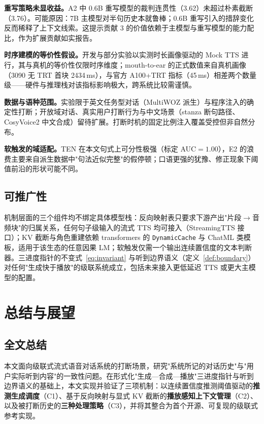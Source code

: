 \documentclass[conference]{IEEEtran}
\theoremstyle{definition}
\begin{document}
\textbf{重写策略未显收益。}A2 中 0.6B 重写模型的裁判连贯性（3.62）未超过朴素截断（3.76）。可能原因：7B 主模型对半句历史本就鲁棒；0.6B 重写引入的措辞变化反而稀释了上下文线索。这提示贡献 3 的价值依赖于主模型与重写模型的能力配比，作为扩展贡献如实报告。

\textbf{时序建模的等价性假设。}开发与部分实验以实测时长画像驱动的 Mock TTS 进行，其与真机的等价性仅限时序维度；mouth-to-ear 的正式数值来自真机画像（3090 无 TRT 首块 2434\,ms），与官方 A100+TRT 指标（45\,ms）相差两个数量级——硬件与推理栈对该指标影响极大，跨系统比较需谨慎。

\textbf{数据与语种范围。}实验限于英文任务型对话（MultiWOZ 派生）与程序注入的确定性打断；开放域对话、真实用户打断行为与中文场景（stanza 断句路径、CosyVoice2 中文合成）留待扩展。打断时机的固定比例注入覆盖受控但非自然分布。

\textbf{软触发的域适配。}TEN 在本文句式上可分性极强（标定 AUC$=1.00$），E2 的浪费主要来自派生数据中"句法近似完整"的假停顿；口语更强的犹豫、修正现象下阈值前沿的形状可能不同。

\subsection{可推广性}
机制层面的三个组件均不绑定具体模型栈：反向映射表只要求下游产出"片段$\rightarrow$音频块"的归属关系，任何句子级输入的流式 TTS 均可接入（StreamingTTS 接口）；KV 截断与角色重建依赖 transformers 的 \texttt{DynamicCache} 与 ChatML 类模板，适用于该生态的任意因果 LM；软触发仅需一个输出连续置信度的文本判断器。三进度指针的不变式~\eqref{eq:invariant} 与听到边界语义（定义~\ref{def:boundary}）对任何"生成快于播放"的级联系统成立，包括未来接入更低延迟 TTS 或更大主模型的配置。

\section{总结与展望}\label{sec:conclusion}

\subsection{全文总结}
本文面向级联式流式语音对话系统的打断场景，研究"系统所记的对话历史"与"用户实际听到内容"的一致性问题。在形式化"生成—合成—播放"三进度指针与听到边界语义的基础上，本文实现并验证了三项机制：以连续置信度推测阈值驱动的\textbf{推测生成调度}（C1）、基于反向映射与显式 KV 截断的\textbf{播放感知上下文管理}（C2）、以及被打断历史的\textbf{三种处理策略}（C3），并将其整合为首个开源、可复现的级联式参考实现。
\end{document}
